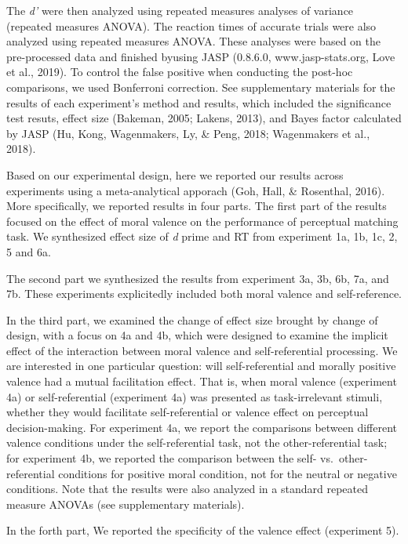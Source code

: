 \documentclass[
  man]{apa6}
\begin{document}
The \emph{d'} were then analyzed using repeated measures analyses of variance (repeated measures ANOVA). The reaction times of accurate trials were also analyzed using repeated measures ANOVA. These analyses were based on the pre-processed data and finished byusing JASP (0.8.6.0, www.jasp-stats.org, Love et al., 2019). To control the false positive when conducting the post-hoc comparisons, we used Bonferroni correction. See supplementary materials for the results of each experiment's method and results, which included the significance test resuts, effect size (Bakeman, 2005; Lakens, 2013), and Bayes factor calculated by JASP (Hu, Kong, Wagenmakers, Ly, \& Peng, 2018; Wagenmakers et al., 2018).

Based on our experimental design, here we reported our results across experiments using a meta-analytical apporach (Goh, Hall, \& Rosenthal, 2016). More specifically, we reported results in four parts. The first part of the results focused on the effect of moral valence on the performance of perceptual matching task. We synthesized effect size of \emph{d} prime and RT from experiment 1a, 1b, 1c, 2, 5 and 6a.

The second part we synthesized the results from experiment 3a, 3b, 6b, 7a, and 7b. These experiments explicitedly included both moral valence and self-reference.

In the third part, we examined the change of effect size brought by change of design, with a focus on 4a and 4b, which were designed to examine the implicit effect of the interaction between moral valence and self-referential processing. We are interested in one particular question: will self-referential and morally positive valence had a mutual facilitation effect. That is, when moral valence (experiment 4a) or self-referential (experiment 4a) was presented as task-irrelevant stimuli, whether they would facilitate self-referential or valence effect on perceptual decision-making. For experiment 4a, we report the comparisons between different valence conditions under the self-referential task, not the other-referential task; for experiment 4b, we reported the comparison between the self- vs.~other-referential conditions for positive moral condition, not for the neutral or negative conditions. Note that the results were also analyzed in a standard repeated measure ANOVAs (see supplementary materials).

In the forth part, We reported the specificity of the valence effect (experiment 5).
\end{document}
